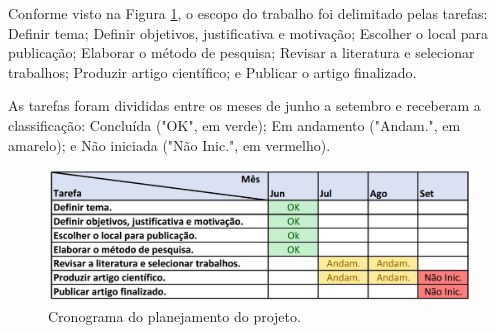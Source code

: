 \documentclass[smallextended]{svjour3}
\begin{document}
	
	
	
	\begin{appendices}
			Conforme visto na Figura \ref{fig:cronograma}, o escopo do trabalho foi delimitado pelas tarefas: Definir tema; Definir objetivos, justificativa e motivação; Escolher o local para publicação; Elaborar o método de pesquisa; Revisar a literatura e selecionar trabalhos; Produzir artigo científico; e Publicar o artigo finalizado. 
			
			As tarefas foram divididas entre os meses de junho a setembro e receberam a classificação: Concluída ("OK", em verde); Em andamento ("Andam.", em amarelo); e Não iniciada ("Não Inic.", em vermelho). 
			
			\begin{figure}[!ht]
				\centering
				\includegraphics[width=1\textwidth]{imagens/cronograma2.jpg}
				\caption{Cronograma do planejamento do projeto.}
				\label{fig:cronograma}
			\end{figure}
	\end{appendices}
	
\end{document}
